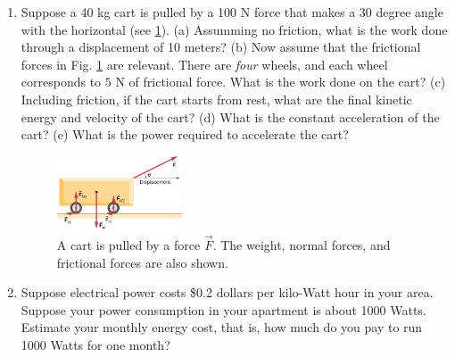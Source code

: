 \documentclass[10pt]{article}
\begin{document}
\begin{enumerate}
\item Suppose a 40 kg cart is pulled by a 100 N force that makes a 30 degree angle with the horizontal (see \ref{fig:cart}).  (a) Assumming no friction, what is the work done through a displacement of 10 meters? (b) Now assume that the frictional forces in Fig. \ref{fig:cart} are relevant.  There are \textit{four} wheels, and each wheel corresponds to $5$ N of frictional force.  What is the work done on the cart? (c) Including friction, if the cart starts from rest, what are the final kinetic energy and velocity of the cart? (d) What is the constant acceleration of the cart? (e) What is the power required to accelerate the cart? \\ \vspace{2cm}
\begin{figure}
\centering
\includegraphics[width=0.35\textwidth]{figures/cart.jpeg}
\caption{\label{fig:cart} A cart is pulled by a force $\vec{F}$.  The weight, normal forces, and frictional forces are also shown.}
\end{figure}
\item Suppose electrical power costs \$0.2 dollars per kilo-Watt hour in your area.  Suppose your power consumption in your apartment is about 1000 Watts.  Estimate your monthly energy cost, that is, how much do you pay to run 1000 Watts for one month?
\end{enumerate}
\end{document}
